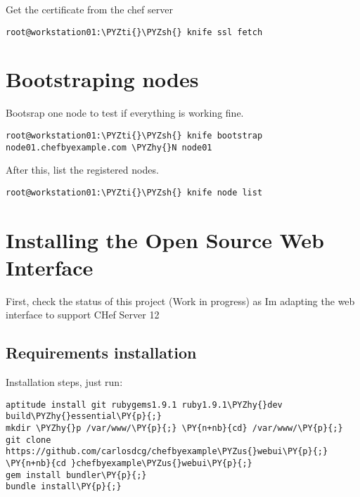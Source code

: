 Get the certificate from the chef server

\begin{codelisting}
\label{code:}
\codecaption{}
\begin{Verbatim}[fontsize=\relsize{-2.5},fontseries=b,commandchars=\\\{\}]
root@workstation01:\PYZti{}\PYZsh{} knife ssl fetch
\end{Verbatim}
\end{codelisting}

\section{Bootstraping nodes}

Bootsrap one node to test if everything is working fine.

\begin{codelisting}
\label{code:}
\codecaption{}
\begin{Verbatim}[fontsize=\relsize{-2.5},fontseries=b,commandchars=\\\{\}]
root@workstation01:\PYZti{}\PYZsh{} knife bootstrap node01.chefbyexample.com \PYZhy{}N node01
\end{Verbatim}
\end{codelisting}

After this, list the registered nodes.

\begin{codelisting}
\label{code:}
\codecaption{}
\begin{Verbatim}[fontsize=\relsize{-2.5},fontseries=b,commandchars=\\\{\}]
root@workstation01:\PYZti{}\PYZsh{} knife node list
\end{Verbatim}
\end{codelisting}

\section{Installing the Open Source Web Interface}

First, check the status of this project (Work in progress) as 
Im adapting the web interface to support CHef Server 12

\subsection{Requirements installation}

Installation steps, just run:
\begin{codelisting}
\label{code:}
\codecaption{}
\begin{Verbatim}[fontsize=\relsize{-2.5},fontseries=b,commandchars=\\\{\}]
aptitude install git rubygems1.9.1 ruby1.9.1\PYZhy{}dev build\PYZhy{}essential\PY{p}{;}
mkdir \PYZhy{}p /var/www/\PY{p}{;} \PY{n+nb}{cd} /var/www/\PY{p}{;} git clone https://github.com/carlosdcg/chefbyexample\PYZus{}webui\PY{p}{;} \PY{n+nb}{cd }chefbyexample\PYZus{}webui\PY{p}{;}
gem install bundler\PY{p}{;}
bundle install\PY{p}{;}
\end{Verbatim}
\end{codelisting}

